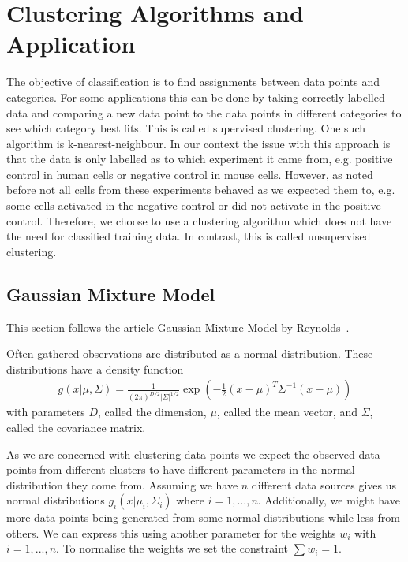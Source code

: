 \chapter{Clustering Algorithms and Application}
\label{chapter:clustering}

The objective of classification is to find assignments between data points and categories. For some applications this can be done by taking correctly labelled data and comparing a new data point to the data points in different categories to see which category best fits. This is called supervised clustering. One such algorithm is k-nearest-neighbour. In our context the issue with this approach is that the data is only labelled as to which experiment it came from, e.g. positive control in human cells or negative control in mouse cells. However, as noted before not all cells from these experiments behaved as we expected them to, e.g. some cells activated in the negative control or did not activate in the positive control. Therefore, we choose to use a clustering algorithm which does not have the need for classified training data. In contrast, this is called unsupervised clustering.

\section{Gaussian Mixture Model}
\label{sec:gaussian_mixture_model}

This section follows the article Gaussian Mixture Model by Reynolds~\cite{reynolds2009}.

Often gathered observations are distributed as a normal distribution. These distributions have a density function
\begin{align*}
	g(x|\mu, \Sigma) = \frac{1}{(2\pi)^{D/2} |\Sigma|^{1/2}} \exp\left( - \frac{1}{2} (x-\mu)^T \Sigma^{-1} (x-\mu) \right)
\end{align*}
with parameters $D$, called the dimension, $\mu$, called the mean vector, and $\Sigma$, called the covariance matrix.

As we are concerned with clustering data points we expect the observed data points from different clusters to have different parameters in the normal distribution they come from. Assuming we have $n$ different data sources gives us normal distributions $g_i(x|\mu_i, \Sigma_i)$ where $i=1, ..., n$. Additionally, we might have more data points being generated from some normal distributions while less from others. We can express this using another parameter for the weights $w_i$ with $i=1, ..., n$. To normalise the weights we set the constraint $\sum w_i = 1$.

